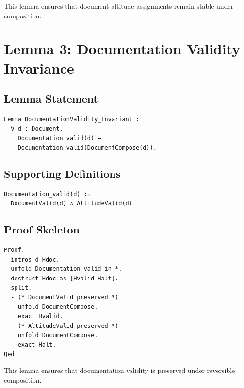 \documentclass[11pt]{article}
\begin{document}
This lemma ensures that document altitude assignments remain stable under
composition.

\newpage


\section{Lemma 3: Documentation Validity Invariance}

\subsection{Lemma Statement}

\begin{verbatim}
Lemma DocumentationValidity_Invariant :
  ∀ d : Document,
    Documentation_valid(d) →
    Documentation_valid(DocumentCompose(d)).
\end{verbatim}

\subsection{Supporting Definitions}

\begin{verbatim}
Documentation_valid(d) :=
  DocumentValid(d) ∧ AltitudeValid(d)
\end{verbatim}

\subsection{Proof Skeleton}

\begin{verbatim}
Proof.
  intros d Hdoc.
  unfold Documentation_valid in *.
  destruct Hdoc as [Hvalid Halt].
  split.
  - (* DocumentValid preserved *)
    unfold DocumentCompose.
    exact Hvalid.
  - (* AltitudeValid preserved *)
    unfold DocumentCompose.
    exact Halt.
Qed.
\end{verbatim}

This lemma ensures that documentation validity is preserved under reversible
composition.

\newpage

\end{document}
